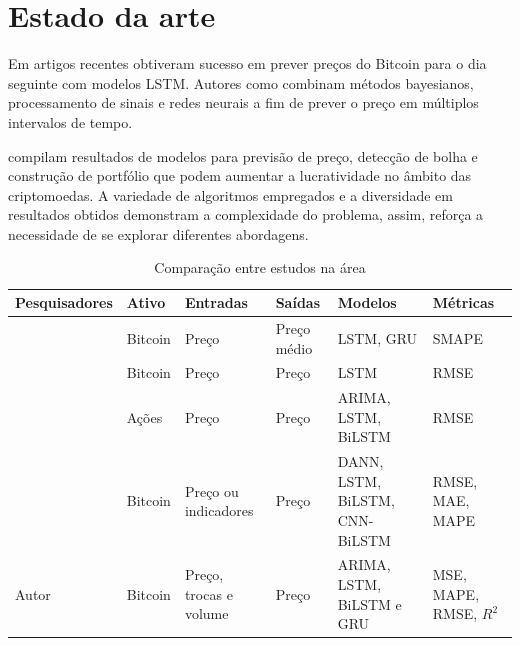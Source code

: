 
\section{Estado da arte} \label{sec:estado}

Em artigos recentes \textcite{Fer} obtiveram sucesso em prever preços do Bitcoin para o dia seguinte com modelos LSTM. Autores como \textcite{Tri} combinam métodos bayesianos, processamento de sinais e redes neurais a fim de prever o preço em múltiplos intervalos de tempo.

\textcite{Zhang} compilam resultados de modelos para previsão de preço, detecção de bolha e construção de portfólio que podem aumentar a lucratividade no âmbito das criptomoedas.
A variedade de algoritmos empregados e a diversidade em resultados obtidos demonstram a complexidade do problema, assim, reforça a necessidade de se explorar diferentes abordagens.

\begin{table}[!htb]
  \scriptsize
  \caption{Comparação entre estudos na área} \label{tabela:lista_estudos}
  \begin{tabularx}{\textwidth}{l|X|X|X|X|X} \hline
    Pesquisadores & Ativo & Entradas & Saídas & Modelos & Métricas \\ \hline
    \cite{lstmvsgru} & Bitcoin & Preço & Preço médio & LSTM, GRU & SMAPE \\ \hline
    \cite{Fer} & Bitcoin & Preço & Preço & LSTM & RMSE \\ \hline
    \cite{Siami} & Ações & Preço & Preço& ARIMA, LSTM, BiLSTM & RMSE \\ \hline
    \cite{Tri} & Bitcoin & Preço ou indicadores& Preço & DANN, LSTM, BiLSTM, CNN-BiLSTM & RMSE, MAE, MAPE \\ \hline
    Autor & Bitcoin & Preço, trocas e volume & Preço & ARIMA, LSTM, BiLSTM e GRU & MSE, MAPE, RMSE, $R^2$ \\ \hline
  \end{tabularx}
\end{table}
